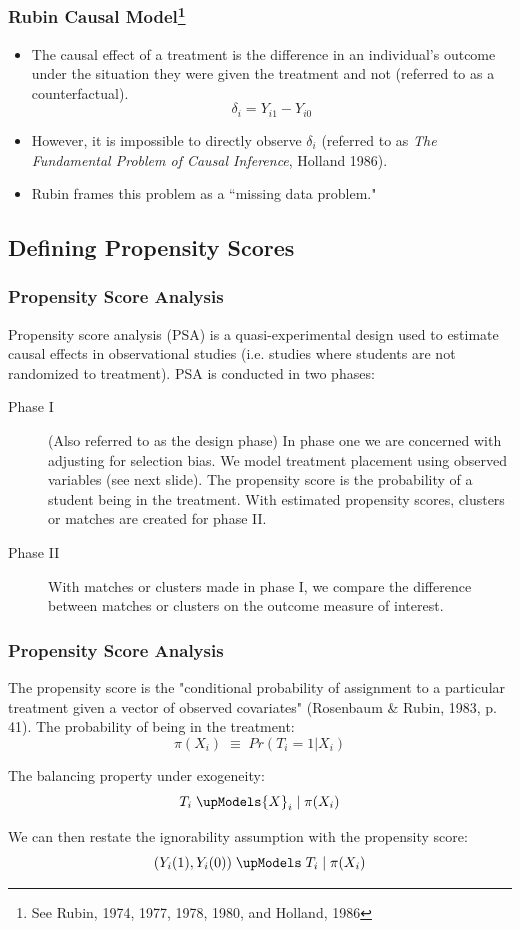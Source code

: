\documentclass[10pt,slidestop,mathserif,c]{beamer}
\begin{document}
\begin{frame}
    \frametitle{Rubin Causal Model\footnote{See Rubin, 1974, 1977, 1978, 1980, and Holland, 1986}}
    \begin{itemize}
        \item The causal effect of a treatment is the difference in an individual's outcome under the situation they were given the treatment and not (referred to as a counterfactual).
        $${\delta}_{i} ={ Y }_{ i1 }-{ Y }_{ i0 }$$
        \item However, it is impossible to directly observe ${\delta}_{i}$ (referred to as \textit{The Fundamental Problem of Causal Inference}, Holland 1986).
        \item Rubin frames this problem as a ``missing data problem."
    \end{itemize}
    
\end{frame}



\subsection{Defining Propensity Scores}

\begin{frame}
    \frametitle{Propensity Score Analysis}
    Propensity score analysis (PSA) is a quasi-experimental design used to estimate causal effects in observational studies (i.e. studies where students are not randomized to treatment). PSA is conducted in two phases:
    \begin{description}
        \item[Phase I] (Also referred to as the design phase) In phase one we are concerned with adjusting for selection bias. We model treatment placement using observed variables (see next slide). The propensity score is the probability of a student being in the treatment. With estimated propensity scores, clusters or matches are created for phase II.
        \item[Phase II] With matches or clusters made in phase I, we compare the difference between matches or clusters on the outcome measure of interest.
    \end{description}
\end{frame}


\begin{frame}
    \frametitle{Propensity Score Analysis}
    The propensity score is the "conditional probability of assignment to a particular treatment given a vector of observed covariates" (Rosenbaum \& Rubin, 1983, p. 41). The probability of being in the treatment:
    $$\pi ({ X }_{ i }) \; \equiv \; Pr({ T }_{ i }=1|{ X }_{ i })$$
    
    The balancing property under exogeneity:
    $${ T }_{ i } \; \upModels { X }_{ i } \;| \; \pi ({ X }_{ i })$$
    
    We can then restate the ignorability assumption with the propensity score: 
    $$({ Y }_{ i }(1),{ Y }_{ i }(0)) \; \upModels \; { T }_{ i } \; | \; \pi({ X }_{ i })$$
\end{frame}
    
\end{document}
